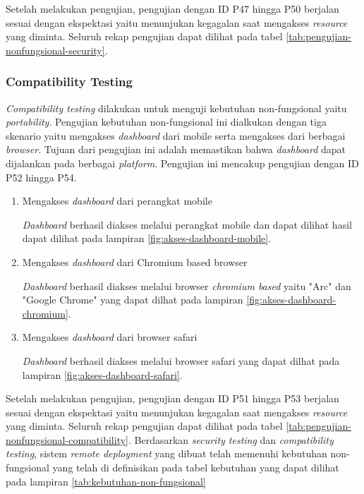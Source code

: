 Setelah melakukan pengujian, pengujian dengan ID P47 hingga P50 berjalan sesuai dengan ekspektasi yaitu menunjukan kegagalan saat mengakses \textit{resource} yang diminta. Seluruh rekap pengujian dapat dilihat pada tabel \ref{tab:pengujian-nonfungsional-security}.

\subsubsection{Compatibility Testing}
\textit{Compatibility testing} dilakukan untuk menguji kebutuhan non-fungsional yaitu \textit{portability}. Pengujian kebutuhan non-fungsional ini dialkukan dengan tiga skenario yaitu mengakses \textit{dashboard} dari mobile serta mengakses dari berbagai \textit{browser}. Tujuan dari pengujian ini adalah memastikan bahwa \textit{dashboard} dapat dijalankan pada berbagai \textit{platform}. Pengujian ini mencakup pengujian dengan ID P52 hingga P54.

\begin{enumerate}
  \item Mengakses \textit{dashboard} dari perangkat mobile

        \textit{Dashboard} berhasil diakses melalui perangkat mobile dan dapat dilihat hasil dapat dilihat pada lampiran \ref{fig:akses-dashboard-mobile}.

  \item Mengakses \textit{dashboard} dari Chromium based browser

        \textit{Dashboard} berhasil diakses melalui browser \textit{chromium based} yaitu "Arc" dan "Google Chrome" yang dapat dilhat pada lampiran \ref{fig:akses-dashboard-chromium}.

  \item Mengakses \textit{dashboard} dari browser safari

        \textit{Dashboard} berhasil diakses melalui browser safari yang dapat dilhat pada lampiran \ref{fig:akses-dashboard-safari}.

\end{enumerate}

Setelah melakukan pengujian, pengujian dengan ID P51 hingga P53 berjalan sesuai dengan ekspektasi yaitu menunjukan kegagalan saat mengakses \textit{resource} yang diminta. Seluruh rekap pengujian dapat dilihat pada tabel \ref{tab:pengujian-nonfungsional-compatibility}.
Berdasarkan \textit{security testing} dan \textit{compatibility testing}, sistem \textit{remote deployment} yang dibuat telah memenuhi kebutuhan non-fungsional yang telah di definisikan pada tabel kebutuhan yang dapat dilihat pada lampiran \ref{tab:kebutuhan-non-fungsional}